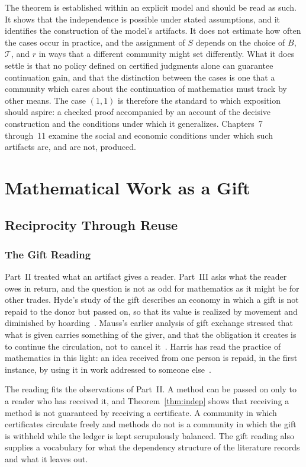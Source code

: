 \documentclass[11pt]{book}
\theoremstyle{definition}
\theoremstyle{remark}
\begin{document}
The theorem is established within an explicit model and should be read as such. It shows that the independence is possible under stated assumptions, and it identifies the construction of the model's artifacts. It does not estimate how often the cases occur in practice, and the assignment of $S$ depends on the choice of $B$, $\mathcal T$, and $r$ in ways that a different community might set differently. What it does settle is that no policy defined on certified judgments alone can guarantee continuation gain, and that the distinction between the cases is one that a community which cares about the continuation of mathematics must track by other means. The case $(1,1)$ is therefore the standard to which exposition should aspire: a checked proof accompanied by an account of the decisive construction and the conditions under which it generalizes. Chapters~7 through~11 examine the social and economic conditions under which such artifacts are, and are not, produced.

\part{Mathematical Work as a Gift}

\chapter{Reciprocity Through Reuse}

\section{The Gift Reading}

Part~II treated what an artifact gives a reader. Part~III asks what the reader owes in return, and the question is not as odd for mathematics as it might be for other trades. Hyde's study of the gift describes an economy in which a gift is not repaid to the donor but passed on, so that its value is realized by movement and diminished by hoarding~\cite{hyde}. Mauss's earlier analysis of gift exchange stressed that what is given carries something of the giver, and that the obligation it creates is to continue the circulation, not to cancel it~\cite{mauss}. Harris has read the practice of mathematics in this light: an idea received from one person is repaid, in the first instance, by using it in work addressed to someone else~\cite{harris}.

The reading fits the observations of Part~II. A method can be passed on only to a reader who has received it, and Theorem~\ref{thm:indep} shows that receiving a method is not guaranteed by receiving a certificate. A community in which certificates circulate freely and methods do not is a community in which the gift is withheld while the ledger is kept scrupulously balanced. The gift reading also supplies a vocabulary for what the dependency structure of the literature records and what it leaves out.
\end{document}
